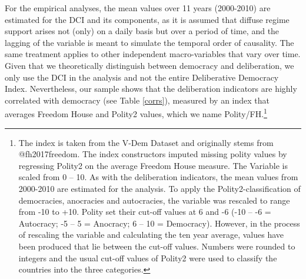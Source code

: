 \documentclass[]{article}
\let\rmarkdownfootnote\footnote%
\def\footnote{\protect\rmarkdownfootnote}
\begin{document}
For the empirical analyses, the mean values over 11 years (2000-2010)
are estimated for the DCI and its components, as it is assumed that
diffuse regime support arises not (only) on a daily basis but over a
period of time, and the lagging of the variable is meant to simulate the
temporal order of causality. The same treatment applies to other
independent macro-variables that vary over time. Given that we
theoretically distinguish between democracy and deliberation, we only
use the DCI in the analysis and not the entire Deliberative Democracy
Index. Nevertheless, our sample shows that the deliberation indicators
are highly correlated with democracy (see Table \ref{corrs}), measured
by an index that averages Freedom House and Polity2 values, which we
name Polity/FH.\footnote{The index is taken from the V-Dem Dataset and
  originally stems from @fh2017freedom. The index constructors imputed
  missing polity values by regressing Polity2 on the average Freedom
  House measure. The Variable is scaled from 0 -- 10. As with the
  deliberation indicators, the mean values from 2000-2010 are estimated
  for the analysis. To apply the Polity2-classification of democracies,
  anocracies and autocracies, the variable was rescaled to range from
  -10 to +10. Polity set their cut-off values at 6 and -6 (-10 -- -6 =
  Autocracy; -5 -- 5 = Anocracy; 6 -- 10 = Democracy). However, in the
  process of rescaling the variable and calculating the ten year
  average, values have been produced that lie between the cut-off
  values. Numbers were rounded to integers and the usual cut-off values
  of Polity2 were used to classify the countries into the three
  categories.}
\end{document}
